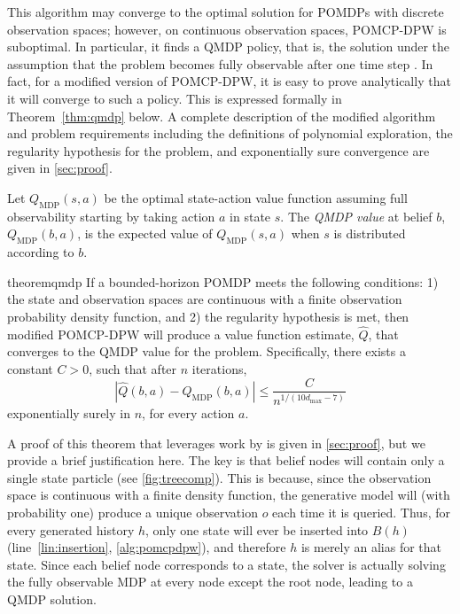 This algorithm may converge to the optimal solution for POMDPs with discrete observation spaces; however, on continuous observation spaces, POMCP-DPW is suboptimal.
In particular, it finds a QMDP policy, that is, the solution under the assumption that the problem becomes fully observable after one time step \cite{littman1995learning,kochenderfer2015decision}.
In fact, for a modified version of POMCP-DPW, it is easy to prove analytically that it will converge to such a policy.
This is expressed formally in Theorem~\ref{thm:qmdp} below.
A complete description of the modified algorithm and problem requirements including the definitions of polynomial exploration, the regularity hypothesis for the problem, and exponentially sure convergence are given in \cref{sec:proof}.

\begin{definition}
    Let $Q_\text{MDP}(s,a)$ be the optimal state-action value function assuming full observability starting by taking action $a$ in state $s$. The \emph{QMDP value} at belief $b$, $Q_\text{MDP}(b,a)$, is the expected value of $Q_\text{MDP}(s,a)$ when $s$ is distributed according to $b$.
\end{definition}

\begin{restatable}{theorem}{qmdp}
    \label{thm:qmdp}
If a bounded-horizon POMDP meets the following conditions: 1) the state and observation spaces are continuous with a finite observation probability density function, and 2) the regularity hypothesis is met, then modified POMCP-DPW will produce a value function estimate, $\hat{Q}$, that converges to the QMDP value for the problem.
Specifically, there exists a constant $C>0$, such that after $n$ iterations,
\begin{equation*}
    \left| \hat{Q}(b,a) - Q_\text{MDP}(b,a) \right| \leq \frac{C}{n^{1/(10d_{\max}-7)}}
\end{equation*}
exponentially surely in $n$, for every action $a$.
\end{restatable}

A proof of this theorem that leverages work by \citet{auger2013continuous} is given in \cref{sec:proof}, but we provide a brief justification here.
The key is that belief nodes will contain only a single state particle (see \cref{fig:treecomp}).
This is because, since the observation space is continuous with a finite density function, the generative model will (with probability one) produce a unique observation $o$ each time it is queried.
Thus, for every generated history $h$, only one state will ever be inserted into $B(h)$ (line~\ref{lin:insertion}, \cref{alg:pomcpdpw}), and therefore $h$ is merely an alias for that state. 
Since each belief node corresponds to a state, the solver is actually solving the fully observable MDP at every node except the root node, leading to a QMDP solution.

